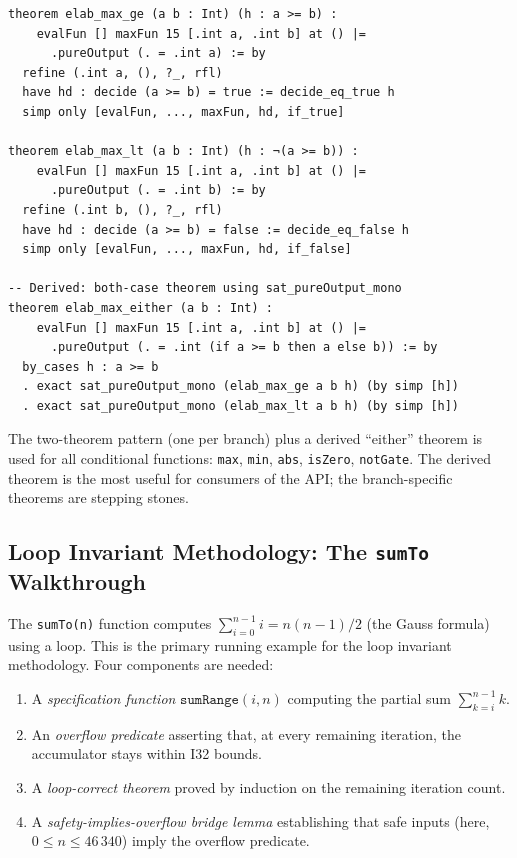 \begin{lstlisting}[caption={F6: max function, ge branch.},label={lst:maxproof}]
theorem elab_max_ge (a b : Int) (h : a >= b) :
    evalFun [] maxFun 15 [.int a, .int b] at () |=
      .pureOutput (. = .int a) := by
  refine (.int a, (), ?_, rfl)
  have hd : decide (a >= b) = true := decide_eq_true h
  simp only [evalFun, ..., maxFun, hd, if_true]

theorem elab_max_lt (a b : Int) (h : ¬(a >= b)) :
    evalFun [] maxFun 15 [.int a, .int b] at () |=
      .pureOutput (. = .int b) := by
  refine (.int b, (), ?_, rfl)
  have hd : decide (a >= b) = false := decide_eq_false h
  simp only [evalFun, ..., maxFun, hd, if_false]

-- Derived: both-case theorem using sat_pureOutput_mono
theorem elab_max_either (a b : Int) :
    evalFun [] maxFun 15 [.int a, .int b] at () |=
      .pureOutput (. = .int (if a >= b then a else b)) := by
  by_cases h : a >= b
  . exact sat_pureOutput_mono (elab_max_ge a b h) (by simp [h])
  . exact sat_pureOutput_mono (elab_max_lt a b h) (by simp [h])
\end{lstlisting}

The two-theorem pattern (one per branch) plus a derived ``either'' theorem
is used for all conditional functions: \texttt{max}, \texttt{min}, \texttt{abs},
\texttt{isZero}, \texttt{notGate}. The derived theorem is the most useful for
consumers of the API; the branch-specific theorems are stepping stones.

\subsection{Loop Invariant Methodology: The \texttt{sumTo} Walkthrough}

The \texttt{sumTo(n)} function computes $\sum_{i=0}^{n-1} i = n(n-1)/2$
(the Gauss formula) using a loop. This is the primary running example for
the loop invariant methodology. Four components are needed:

\begin{enumerate}[leftmargin=2em,label=\textbf{\arabic*.}]
  \item A \emph{specification function} $\texttt{sumRange}(i, n)$
        computing the partial sum $\sum_{k=i}^{n-1} k$.
  \item An \emph{overflow predicate} \SumToOv asserting that, at every
        remaining iteration, the accumulator stays within I32 bounds.
  \item A \emph{loop-correct theorem} proved by induction on the remaining
        iteration count.
  \item A \emph{safety-implies-overflow bridge lemma} establishing that
        safe inputs (here, $0 \le n \le 46\,340$) imply the overflow predicate.
\end{enumerate}

